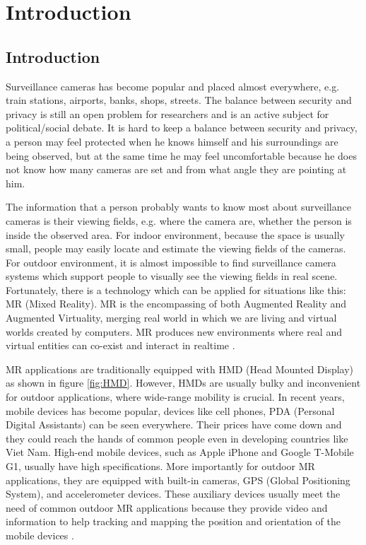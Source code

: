 \chapter{Introduction} %
\label{Chapter1}


\section{Introduction}

Surveillance cameras has become popular and placed almost everywhere, e.g. train stations, airports, banks, shops, streets. The balance between security and privacy is still an open problem for researchers and is an active subject for political/social debate. It is hard to keep a balance between security and privacy, a person may feel protected when he knows himself and his surroundings are being observed, but at the same time he may feel uncomfortable because he does not know how many cameras are set and from what angle they are pointing at him.

The information that a person probably wants to know most about surveillance cameras is their viewing fields, e.g. where the camera are, whether the person is inside the observed area. For indoor environment, because the space is usually small, people may easily locate and estimate the viewing fields of the cameras. For outdoor environment, it is almost impossible to find surveillance camera systems which support people to visually see the viewing fields in real scene. Fortunately, there is a technology which can be applied for situations like this: MR (Mixed Reality). MR is the encompassing of both Augmented Reality and Augmented Virtuality, merging real world in which we are living and virtual worlds created by computers. MR produces new environments where real and virtual entities can co-exist and interact in realtime \citep{Reference3}.

MR applications are traditionally equipped with HMD (Head Mounted Display) as shown in figure \ref{fig:HMD}. However, HMDs are usually bulky and inconvenient for outdoor applications, where wide-range mobility is crucial. In recent years, mobile devices has become popular, devices like cell phones, PDA (Personal Digital Assistants) can be seen everywhere. Their prices have come down and they could reach the hands of common people even in developing countries like Viet Nam. High-end mobile devices, such as Apple iPhone and Google T-Mobile G1, usually have high specifications. More importantly for outdoor MR applications, they are equipped with built-in cameras, GPS (Global Positioning System), and accelerometer devices. These auxiliary devices usually meet the need of common outdoor MR applications because they provide video and information to help tracking and mapping the position and orientation of the mobile devices \citep{Reference2} \citep{Reference4}.


